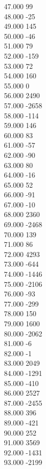 { 47.000	99 \\
 48.000	-25 \\
 49.000	145 \\
 50.000	-46 \\
 51.000	79 \\
 52.000	-159 \\
 53.000	72 \\
 54.000	160 \\
 55.000	0 \\
 56.000	2490 \\
 57.000	-2658 \\
 58.000	-114 \\
 59.000	146 \\
 60.000	83 \\
 61.000	-57 \\
 62.000	-90 \\
 63.000	80 \\
 64.000	-16 \\
 65.000	52 \\
 66.000	-91 \\
 67.000	-10 \\
 68.000	2360 \\
 69.000	-2468 \\
 70.000	139 \\
 71.000	86 \\
 72.000	4293 \\
 73.000	-644 \\
 74.000	-1446 \\
 75.000	-2106 \\
 76.000	-93 \\
 77.000	-299 \\
 78.000	150 \\
 79.000	1600 \\
 80.000	-2062 \\
 81.000	-6 \\
 82.000	-1 \\
 83.000	2049 \\
 84.000	-1291 \\
 85.000	-410 \\
 86.000	2527 \\
 87.000	-2455 \\
 88.000	396 \\
 89.000	-421 \\
 90.000	252 \\
 91.000	3569 \\
 92.000	-1431 \\
 93.000	-2199 \\
}
